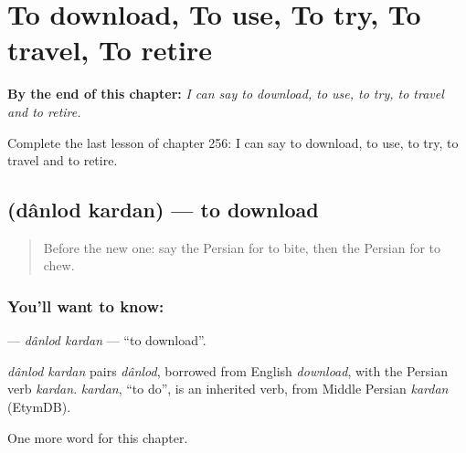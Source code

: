 
\chapter{To download, To use, To try, To travel, To retire}
\label{ch:fa-to-download-to-use-to-try-to-travel-to-retire}

\begin{chapteropening}
\textbf{By the end of this chapter:} \emph{I can say to download, to use, to try, to travel and to retire.}

Complete the last lesson of chapter 256: I can say to download, to use, to try, to travel and to retire.
\end{chapteropening}

\section[\texorpdfstring{\fa{دانلود} \fa{کردن} (dânlod kardan)}{دانلود کردن (dânlod kardan)}]{  (dânlod kardan) — to download}

\label{lesson:FA-C256-danlod-kardan}



\begin{quote}
Before the new one: say the Persian for to bite, then the Persian for to chew.
\end{quote}

\subsection*{You'll want to know:  }
\textbf{ } — \emph{dânlod kardan} — \textquotedblleft{}to download\textquotedblright{}.

\begin{cousinweb}
\emph{dânlod kardan} pairs \emph{dânlod}, borrowed from English \emph{download}, with the Persian verb \emph{kardan}. \emph{kardan}, \textquotedblleft{}to do\textquotedblright{}, is an inherited verb, from Middle Persian \emph{kardan} (EtymDB).
\end{cousinweb}

\begin{grammarlens}[title={What you've built}]
One more word for this chapter.
\end{grammarlens}

